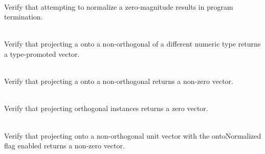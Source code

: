 \begin{DoxyRefList}
\item[{\parbox[t]{\linewidth}{Member \doxylink{group___f_g_m___vec4___normalize_gac1e5677cd2c09846c0b63922b5b5863b}{Vector4\+DNormalization\+\_\+\+Zero\+Vector\+When\+Normalization\+Causes\+Death} ()}}]\hfill \\
\label{test__test000115}%
%
Verify that attempting to normalize a zero-\/magnitude  results in program termination.  
\item[{\parbox[t]{\linewidth}{Member \doxylink{group___f_g_m___vec4___proj_ga885ce49a7546499ce3e7dd308607316c}{Vector4\+DProjection\+\_\+\+Mixed\+Type\+Projection\+Promotes\+Type} ()}}]\hfill \\
\label{test__test000134}%
%
Verify that projecting a  onto a non-\/orthogonal  of a different numeric type returns a type-\/promoted vector.  
\item[{\parbox[t]{\linewidth}{Member \doxylink{group___f_g_m___vec4___proj_ga1be55d6d0574d6245f0542df0ed799a2}{Vector4\+DProjection\+\_\+\+Non\+Orthogonal\+Projection\+Returns\+Non\+Zero\+Vector} ()}}]\hfill \\
\label{test__test000130}%
%
Verify that projecting a  onto a non-\/orthogonal  returns a non-\/zero vector.  
\item[{\parbox[t]{\linewidth}{Member \doxylink{group___f_g_m___vec4___proj_ga2d36e548a5fa68485f9df5e99b976054}{Vector4\+DProjection\+\_\+\+Orthogonal\+Vectors\+Returns\+Zero\+Vector} ()}}]\hfill \\
\label{test__test000125}%
%
Verify that projecting orthogonal  instances returns a zero vector.  
\item[{\parbox[t]{\linewidth}{Member \doxylink{group___f_g_m___vec4___proj_ga5c98e5dfa6f33cf5ef4bb5899521b7ba}{Vector4\+DProjection\+\_\+\+Projection\+Onto\+Normalized\+Vector\+Returns\+Non\+Zero\+Vector} ()}}]\hfill \\
\label{test__test000132}%
%
Verify that projecting onto a non-\/orthogonal unit vector with the {\ttfamily onto\+Normalized} flag enabled returns a non-\/zero vector.  
\item[{\parbox[t]{\linewidth}{Member \doxylink{group___f_g_m___vec4___proj_gad198f693248bbefe2a057a692382b4c5}{Vector4\+DProjection\+\_\+\+Projection\+Onto\+Vector\+In\+Opposite\+Direction\+Returns\+Non\+Zero\+Vector\+In\+Same\+Direction} ()}}]\hfill \\

\end{DoxyRefList}
